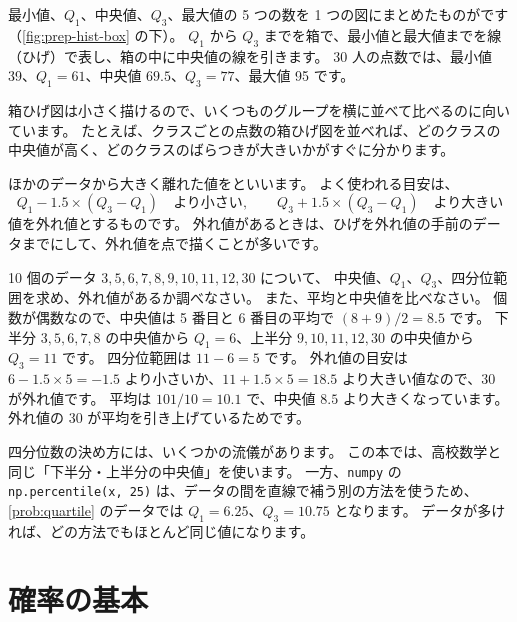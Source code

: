 最小値、$Q_1$、中央値、$Q_3$、最大値の 5 つの数を 1 つの図にまとめたものがです（\cref{fig:prep-hist-box} の下）。
$Q_1$ から $Q_3$ までを箱で、最小値と最大値までを線（ひげ）で表し、箱の中に中央値の線を引きます。
30 人の点数では、最小値 39、$Q_1 = 61$、中央値 $69.5$、$Q_3 = 77$、最大値 95 です。

\begin{merit}
  箱ひげ図は小さく描けるので、いくつものグループを横に並べて比べるのに向いています。
  たとえば、クラスごとの点数の箱ひげ図を並べれば、どのクラスの中央値が高く、どのクラスのばらつきが大きいかがすぐに分かります。
\end{merit}

ほかのデータから大きく離れた値をといいます。
よく使われる目安は、
\[
  Q_1 - 1.5 \times (Q_3 - Q_1) \quad \text{より小さい}, \qquad
  Q_3 + 1.5 \times (Q_3 - Q_1) \quad \text{より大きい}
\]
値を外れ値とするものです。
外れ値があるときは、ひげを外れ値の手前のデータまでにして、外れ値を点で描くことが多いです。

\begin{problem}
  10 個のデータ $3, 5, 6, 7, 8, 9, 10, 11, 12, 30$ について、
  中央値、$Q_1$、$Q_3$、四分位範囲を求め、外れ値があるか調べなさい。
  また、平均と中央値を比べなさい。
  \tcblower
  個数が偶数なので、中央値は 5 番目と 6 番目の平均で $(8+9)/2 = 8.5$ です。
  下半分 $3, 5, 6, 7, 8$ の中央値から $Q_1 = 6$、上半分 $9, 10, 11, 12, 30$ の中央値から $Q_3 = 11$ です。
  四分位範囲は $11 - 6 = 5$ です。
  外れ値の目安は $6 - 1.5 \times 5 = -1.5$ より小さいか、$11 + 1.5 \times 5 = 18.5$ より大きい値なので、$30$ が外れ値です。
  平均は $101/10 = 10.1$ で、中央値 $8.5$ より大きくなっています。
  外れ値の $30$ が平均を引き上げているためです。
\end{problem}

\begin{supplement}[四分位数の計算方法はいろいろある]
  四分位数の決め方には、いくつかの流儀があります。
  この本では、高校数学と同じ「下半分・上半分の中央値」を使います。
  一方、\texttt{numpy} の \texttt{np.percentile(x, 25)} は、データの間を直線で補う別の方法を使うため、
  \cref{prob:quartile} のデータでは $Q_1 = 6.25$、$Q_3 = 10.75$ となります。
  データが多ければ、どの方法でもほとんど同じ値になります。
\end{supplement}

\section{確率の基本}
\label{sec:stat-probability-basics}

